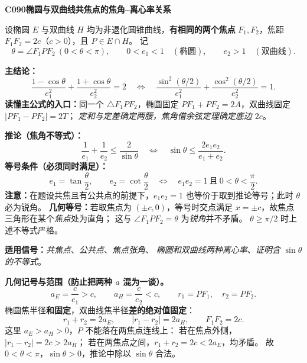 \begin{statementbox}
\textbf{C090\quad 椭圆与双曲线共焦点的焦角--离心率关系}

设椭圆 $E$ 与双曲线 $H$ 均为非退化圆锥曲线，\textbf{有相同的两个焦点}
$F_1,F_2$，焦距 $F_1F_2=2c$（$c>0$），且 $P\in E\cap H$。
记
\[
\theta=\angle F_1PF_2\ (0<\theta<\pi),\qquad
0<e_1<1\quad(\text{椭圆}),\qquad e_2>1\quad(\text{双曲线}).
\]

\begin{center}

\end{center}
\textbf{主结论：}
\[
\boxed{\frac{1-\cos\theta}{e_1^2}+
\frac{1+\cos\theta}{e_2^2}=2}
\quad\Longleftrightarrow\quad
\boxed{\frac{\sin^2(\theta/2)}{e_1^2}+
\frac{\cos^2(\theta/2)}{e_2^2}=1}.
\]
\medskip
\textbf{读懂主公式的入口：}同一个 $\triangle F_1PF_2$，椭圆固定
$PF_1+PF_2=2A$，双曲线固定 $|PF_1-PF_2|=2T$；
\emph{定和与定差确定两腰，焦角借余弦定理确定底边 $2c$}。
\end{statementbox}

\clearpage
\begin{statementbox}
\textbf{推论（焦角不等式）：}
\[
\boxed{\frac1{e_1}+\frac1{e_2}\le\frac2{\sin\theta}}
\quad\Longleftrightarrow\quad
\boxed{\sin\theta\le\frac{2e_1e_2}{e_1+e_2}}.
\]
\textbf{等号条件（必须同时满足）：}
\[
\boxed{e_1=\tan\frac\theta2,\qquad
 e_2=\cot\frac\theta2}\quad\Longleftrightarrow\quad
\boxed{e_1e_2=1\ \text{且}\ 0<\theta<\frac\pi2}.
\]
\textbf{注意：}在题设共焦且有公共点的前提下，$e_1e_2=1$
也等价于取到推论等号；此时 $\theta$ 必为锐角。
\textbf{几何等号：}若取焦点为 $(\pm c,0)$，等号时交点满足
$x=\pm c$，故焦点三角形在某个\emph{焦点}处为直角；
这与 $\angle F_1PF_2=\theta$ 为\emph{锐角}并不矛盾。
$\theta\ge\pi/2$ 时上述不等式严格。

\textbf{适用信号：}\emph{共焦点}、\emph{公共点}、\emph{焦点张角}、
\emph{椭圆和双曲线两种离心率}、\emph{证明含 $\sin\theta$ 的不等式}。

\medskip
\textbf{几何记号与范围（防止把两种 $a$ 混为一谈）。}
\[
 a_E=\frac{c}{e_1}>c,\qquad
 a_H=\frac{c}{e_2}<c,\qquad
 r_1=PF_1,\quad r_2=PF_2.
\]
椭圆焦半径\textbf{和固定}，双曲线焦半径\textbf{差的绝对值固定}：
\[
 \boxed{r_1+r_2=2a_E},\qquad
 \boxed{|r_1-r_2|=2a_H},\qquad F_1F_2=2c.
\]
这里 $a_E>a_H>0$，$P$ 不能落在两焦点连线上：
若在焦点外侧，$|r_1-r_2|=2c>2a_H$；
若在两焦点之间，$r_1+r_2=2c<2a_E$，均矛盾。
故 $0<\theta<\pi$，$\sin\theta>0$，推论中除以 $\sin\theta$ 合法。
\end{statementbox}
